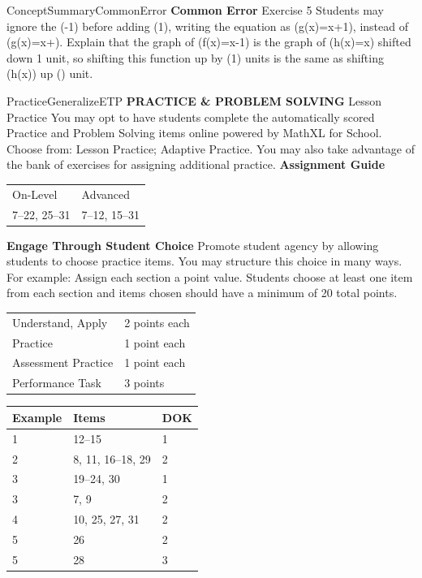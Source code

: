 \documentclass{article}
\newenvironment{item-analysis}{}{}      %
\newenvironment{te-addendum}[2]{}{}     %
\newcommand{\te}[1]{}                   %
\begin{document}
\begin{te-addendum}{ConceptSummary}{CommonError}
\textbf{Common Error}
Exercise 5 Students may ignore the (-1) before adding (1), writing the equation as (g(x)=\ln x+1), instead of (g(x)=\ln x+). Explain that the graph of (f(x)=\ln x-1) is the graph of (h(x)=\ln x) shifted down 1 unit, so shifting this function up by (1) units is the same as shifting (h(x)) up () unit.
\te{Printed Exercise 5; likely Exercise 6.}
\end{te-addendum}
\begin{te-addendum}{Practice}{GeneralizeETP}
\textbf{PRACTICE & PROBLEM SOLVING}
Lesson Practice You may opt to have students complete the automatically scored Practice and Problem Solving items online powered by MathXL for School.
Choose from: Lesson Practice; Adaptive Practice.
You may also take advantage of the bank of exercises for assigning additional practice.
\textbf{Assignment Guide}
\begin{tabular}{ll}
On-Level & Advanced \\
7--22, 25--31 & 7--12, 15--31 \\
\end{tabular}
\textbf{Engage Through Student Choice}
Promote student agency by allowing students to choose practice items. You may structure this choice in many ways.
For example:
Assign each section a point value. Students choose at least one item from each section and items chosen should have a minimum of 20 total points.
\begin{tabular}{ll}
Understand, Apply & 2 points each \\
Practice & 1 point each \\
Assessment Practice & 1 point each \\
Performance Task & 3 points \\
\end{tabular}
\end{te-addendum}
\begin{item-analysis}
\begin{tabular}{lll}
\toprule
Example & Items & DOK \\
\midrule
1 & 12--15 & 1 \\
2 & 8, 11, 16--18, 29 & 2 \\
3 & 19--24, 30 & 1 \\
3 & 7, 9 & 2 \\
4 & 10, 25, 27, 31 & 2 \\
5 & 26 & 2 \\
5 & 28 & 3 \\
\bottomrule
\end{tabular}
\te{Printed Item Analysis refers to Example 5 although the lesson contains Examples 1--4, and lists 7 and 8 although Practice & Problem Solving begins with 9. The table is preserved verbatim. Items 32 and 33 are omitted.}
\end{item-analysis}
\end{document}
